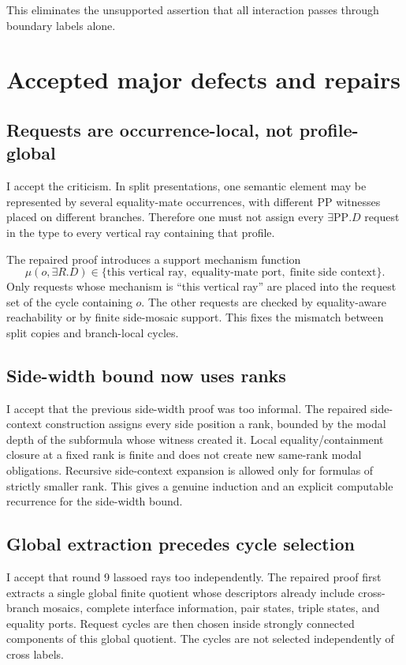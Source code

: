 \documentclass[11pt]{article}
\newcommand{\PP}{\mathrm{PP}}
\begin{document}
This eliminates the unsupported assertion that all interaction passes through boundary labels alone.

\section{Accepted major defects and repairs}

\subsection{Requests are occurrence-local, not profile-global}

I accept the criticism.  In split presentations, one semantic element may be represented by several equality-mate occurrences, with different $\PP$ witnesses placed on different branches.  Therefore one must not assign every $\exists\PP.D$ request in the type to every vertical ray containing that profile.

The repaired proof introduces a support mechanism function
\[
   \mu(o,\exists R.D)
   \in
   \{\text{this vertical ray},\; \text{equality-mate port},\; \text{finite side context}\}.
\]
Only requests whose mechanism is ``this vertical ray'' are placed into the request set of the cycle containing $o$.  The other requests are checked by equality-aware reachability or by finite side-mosaic support.  This fixes the mismatch between split copies and branch-local cycles.

\subsection{Side-width bound now uses ranks}

I accept that the previous side-width proof was too informal.  The repaired side-context construction assigns every side position a rank, bounded by the modal depth of the subformula whose witness created it.  Local equality/containment closure at a fixed rank is finite and does not create new same-rank modal obligations.  Recursive side-context expansion is allowed only for formulas of strictly smaller rank.  This gives a genuine induction and an explicit computable recurrence for the side-width bound.

\subsection{Global extraction precedes cycle selection}

I accept that round 9 lassoed rays too independently.  The repaired proof first extracts a single global finite quotient whose descriptors already include cross-branch mosaics, complete interface information, pair states, triple states, and equality ports.  Request cycles are then chosen inside strongly connected components of this global quotient.  The cycles are not selected independently of cross labels.
\end{document}
